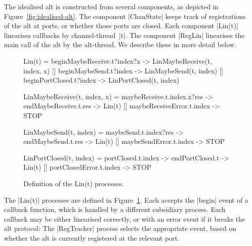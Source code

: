 The idealised alt is constructed from several components, as depicted in
Figure~\ref{fig:idealised-alt}.  The component |ChanState| keeps track of
registrations of the alt at ports, or whether those ports are closed.  Each
component |Lin(t)| linearises callbacks by channel-thread~|t|.  The component
|RegLin| linearises the main call of the alt by the alt-thread.  We describe
these in more detail below.


\begin{figure}
\begin{cspm}
Lin(t) = 
  beginMaybeReceive.t?index?x -> LinMaybeReceive(t, index, x)
  [] beginMaybeSend.t?index -> LinMaybeSend(t, index)
  [] beginPortClosed.t?index -> LinPortClosed(t, index)
  
LinMaybeReceive(t, index, x) = 
  maybeReceive.t.index.x?res -> endMaybeReceive.t.res -> Lin(t)
  [] maybeReceiveError.t.index -> STOP
  
LinMaybeSend(t, index) = 
  maybeSend.t.index?res -> endMaybeSend.t.res -> Lin(t)
  [] maybeSendError.t.index -> STOP
  
LinPortClosed(t, index) = 
  portClosed.t.index -> endPortClosed.t -> Lin(t)
  [] portClosedError.t.index -> STOP
\end{cspm}
\caption{Definition of the {\scalastyle Lin(t)}
  processes.  \label{fig:alt-lin}} 
\end{figure}


The |Lin(t)| processes are defined in Figure~\ref{fig:alt-lin}.  Each accepts
the |begin| event of a callback function, which is handled by a different
subsidiary process.  Each callback may be either linearised correctly, or with
an error event if it breaks the alt protocol: The |RegTracker| process selects
the appropriate event, based on whether the alt is currently registered at the
relevant port.


